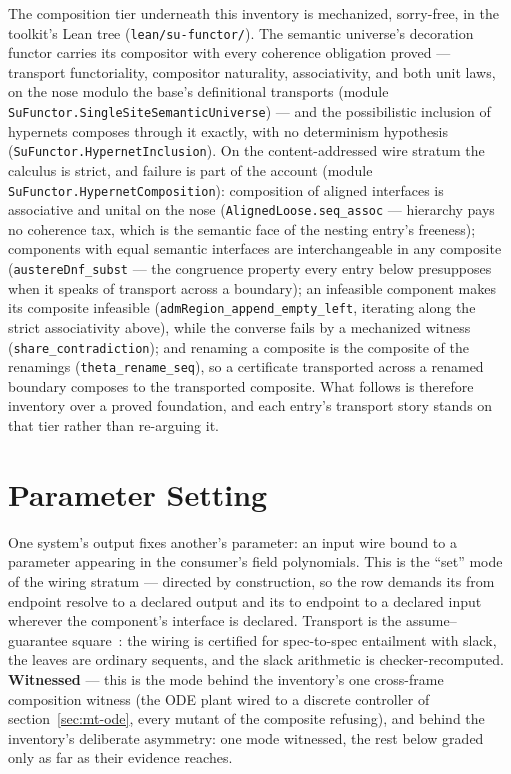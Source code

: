The composition tier underneath this inventory is mechanized,
sorry-free, in the toolkit's Lean tree (\texttt{lean/su-functor/}).
The semantic universe's decoration functor carries its compositor with
every coherence obligation proved --- transport functoriality,
compositor naturality, associativity, and both unit laws, on the nose
modulo the base's definitional transports (module
\texttt{SuFunctor.SingleSiteSemanticUniverse}) --- and the possibilistic
inclusion of hypernets composes through it exactly, with no determinism
hypothesis (\texttt{SuFunctor.HypernetInclusion}). On the
content-addressed wire stratum the calculus is strict, and failure is
part of the account (module \texttt{SuFunctor.HypernetComposition}): composition of
aligned interfaces is associative and unital on the nose
(\texttt{AlignedLoose.seq\_assoc} --- hierarchy pays no coherence tax,
which is the semantic face of the nesting entry's freeness);
components with equal semantic interfaces are interchangeable in any
composite (\texttt{austereDnf\_subst} --- the congruence property every
entry below presupposes when it speaks of transport across a
boundary); an infeasible component makes its composite infeasible
(\texttt{admRegion\_append\_empty\_left}, iterating along the strict
associativity above), while the converse fails by a mechanized witness
(\texttt{share\_contradiction}); and renaming a composite is the
composite of the renamings (\texttt{theta\_rename\_seq}), so a
certificate transported across a renamed boundary composes to the
transported composite. What follows is therefore inventory over a
proved foundation, and each entry's transport story stands on that
tier rather than re-arguing it.

\section{Parameter Setting}
\label{sec:cp-set}

One system's output fixes another's parameter: an input wire bound to
a parameter appearing in the consumer's field polynomials. This is the
``set'' mode of the wiring stratum --- directed by construction, so
the row demands its \textsf{from} endpoint resolve to a declared
output and its \textsf{to} endpoint to a declared input wherever the
component's interface is declared. Transport is the assume--guarantee
square~\cite{capucci26}: the wiring is certified for spec-to-spec entailment with
slack, the leaves are ordinary sequents, and the slack arithmetic is
checker-recomputed. \textbf{Witnessed} --- this is the mode behind the
inventory's one cross-frame composition witness (the ODE plant wired
to a discrete controller of
section~\ref{sec:mt-ode}, every mutant of the composite refusing),
and behind the inventory's deliberate asymmetry: one mode witnessed,
the rest below graded only as far as their evidence reaches.

